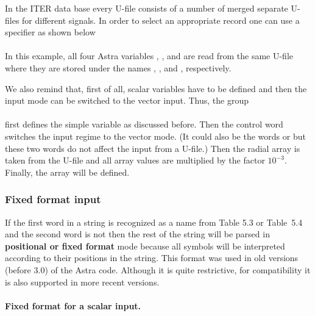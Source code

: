 In the ITER data base every U-file consists of a number of merged
separate U-files for different signals.
In order to select an appropriate record one can use a specifier
 as shown below
\\
\\
In this example, all four Astra variables , ,
 and  are read from the same U-file 
where they are stored under the names , ,  and
, respectively. 

We also remind that, first of all, scalar variables have to be defined
and then the input mode can be switched to the vector input.
Thus, the group
\\
\\
first defines the simple variable  as discussed before.
Then the control word  switches the input regime to the
vector mode.
(It could also be the words  or  but these two
words do not affect the input from a U-file.)
Then the radial array  is taken from the U-file 
 and all array values are multiplied by the
factor $10^{-3}.$ 
Finally, the array  will be defined.

\subsubsection{Fixed format input}

If the first word in a string is recognized as a name from Table 5.3 or
Table~5.4 and the second word is not  then the rest of the
string will be parsed in {\bf positional or fixed format} mode because all symbols will be interpreted according to their
positions in the string. 
This format was used in old versions (before 3.0) of the Astra code. 
Although it is quite restrictive, for compatibility it is also supported
in more recent versions. 

\paragraph{Fixed format for a scalar input.}

